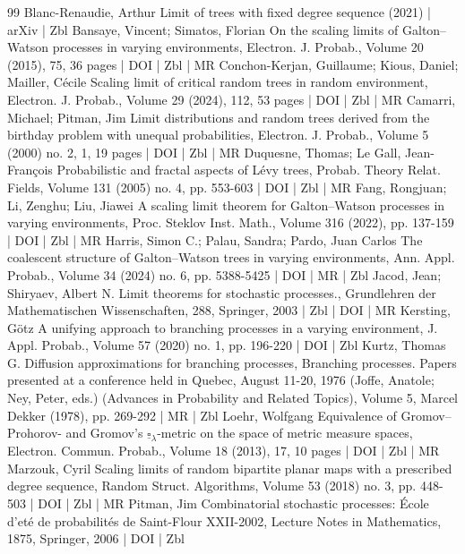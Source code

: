 \documentclass[10pt]{amsart}
\theoremstyle{definition}\newtheorem{defi}[theo]{Definition}\newtheorem{rema}[theo]{Remark}\newtheorem{exam}[theo]{Example}\newtheorem{exem}[theo]{Example}\newtheorem{nota}[theo]{Notation}
\newcommand{\1}{\mathbbm{1}}
\begin{document}
\begin{thebibliography}{99}
 Blanc-Renaudie, Arthur Limit of trees with fixed degree sequence (2021) | arXiv | Zbl
 Bansaye, Vincent; Simatos, Florian On the scaling limits of Galton–Watson processes in varying environments, Electron. J. Probab., Volume 20 (2015), 75, 36 pages | DOI | Zbl | MR
 Conchon-Kerjan, Guillaume; Kious, Daniel; Mailler, Cécile Scaling limit of critical random trees in random environment, Electron. J. Probab., Volume 29 (2024), 112, 53 pages | DOI | Zbl | MR
 Camarri, Michael; Pitman, Jim Limit distributions and random trees derived from the birthday problem with unequal probabilities, Electron. J. Probab., Volume 5 (2000) no. 2, 1, 19 pages | DOI | Zbl | MR
 Duquesne, Thomas; Le Gall, Jean-François Probabilistic and fractal aspects of Lévy trees, Probab. Theory Relat. Fields, Volume 131 (2005) no. 4, pp. 553-603 | DOI | Zbl | MR
 Fang, Rongjuan; Li, Zenghu; Liu, Jiawei A scaling limit theorem for Galton–Watson processes in varying environments, Proc. Steklov Inst. Math., Volume 316 (2022), pp. 137-159 | DOI | Zbl | MR
 Harris, Simon C.; Palau, Sandra; Pardo, Juan Carlos The coalescent structure of Galton–Watson trees in varying environments, Ann. Appl. Probab., Volume 34 (2024) no. 6, pp. 5388-5425 | DOI | MR | Zbl
 Jacod, Jean; Shiryaev, Albert N. Limit theorems for stochastic processes., Grundlehren der Mathematischen Wissenschaften, 288, Springer, 2003 | Zbl | DOI | MR
 Kersting, Götz A unifying approach to branching processes in a varying environment, J. Appl. Probab., Volume 57 (2020) no. 1, pp. 196-220 | DOI | Zbl
 Kurtz, Thomas G. Diffusion approximations for branching processes, Branching processes. Papers presented at a conference held in Quebec, August 11-20, 1976 (Joffe, Anatole; Ney, Peter, eds.) (Advances in Probability and Related Topics), Volume 5, Marcel Dekker (1978), pp. 269-292 | MR | Zbl
 Loehr, Wolfgang Equivalence of Gromov–Prohorov- and Gromov’s ${\underline{\square }_{\lambda }}$-metric on the space of metric measure spaces, Electron. Commun. Probab., Volume 18 (2013), 17, 10 pages | DOI | Zbl | MR
 Marzouk, Cyril Scaling limits of random bipartite planar maps with a prescribed degree sequence, Random Struct. Algorithms, Volume 53 (2018) no. 3, pp. 448-503 | DOI | Zbl | MR
 Pitman, Jim Combinatorial stochastic processes: École d’eté de probabilités de Saint-Flour XXII-2002, Lecture Notes in Mathematics, 1875, Springer, 2006 | DOI | Zbl
\end{thebibliography}
\end{document}
